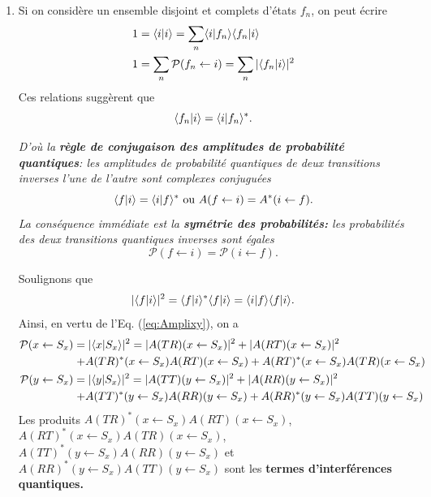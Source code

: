 \begin{enumerate}
\item Si on considère un ensemble disjoint et complets d'états $f_{n}$, on
peut écrire%
\begin{subequations}%
\begin{align}
1  &  =\langle i\ket{i} =\sum_{n}\langle i\ket{f_{n}}\langle f_{n}\ket{i} \\
1  &  =\sum_{n}\mathcal{P}(f_{n}\leftarrow i)=\sum_{n}|\langle
f_{n}\ket{i}|^{2}%
\end{align}%
\end{subequations}%
Ces relations suggèrent que%
\begin{equation}
\langle f_{n}\vert i\rangle =\langle i\vert f_{n}\rangle^{\ast}.
\end{equation}
\colorbox[gray]{0.8}{
\parbox[c]{0.9\textwidth}{
\emph{D'où la \textbf{règle de conjugaison des amplitudes de probabilité
quantiques}: les amplitudes de probabilité quantiques de deux transitions
inverses l'une de l'autre sont complexes conjuguées}
\begin{equation}
\langle f\vert i\rangle =\langle i\vert f\rangle^{\ast }\text{ ou }A(f\leftarrow
i)=A^{\ast}(i\leftarrow f).\label{eq:ReglConjug}
\end{equation}
\emph{La conséquence immédiate est la \textbf{symétrie des probabilités:} les
probabilités des deux transitions quantiques inverses sont égales}
\begin{equation}
\mathcal{P}(f\leftarrow i)=\mathcal{P}(i\leftarrow f).
\end{equation}
}}
\medskip

Soulignons que
\begin{equation}
|\langle f\vert i\rangle |^{2}=\langle f\vert i\rangle ^{\ast}\langle f\vert i\rangle
=\langle i\vert f\rangle\langle f\vert i\rangle .
\end{equation}
Ainsi, en vertu de l'Eq. (\ref{eq:Amplixy}), on a%
\begin{subequations}%
\begin{align}
\mathcal{P}(x\leftarrow S_{x}) & =|\bra{x}S_{x}\rangle|^{2}=|A(TR)(x\leftarrow
S_{x})|^{2}+|A(RT)(x\leftarrow S_{x})|^{2}\nonumber\\
&  \left.  +A(TR)^{\ast}(x\leftarrow S_{x})A(RT)(x\leftarrow S_{x})
+A(RT)^{\ast}(x\leftarrow S_{x})A(TR)(x\leftarrow S_{x})\right. \\
\mathcal{P}(y\leftarrow S_{x}) & =|\bra{y}S_{x}\rangle|^{2}=|A(TT)(y\leftarrow
S_{x})|^{2}+|A(RR)(y\leftarrow S_{x})|^{2}\nonumber\\
&  \left.  +A(TT)^{\ast}(y\leftarrow S_{x})A(RR)(y\leftarrow S_{x}%
)+A(RR)^{\ast}(y\leftarrow S_{x})A(TT)(y\leftarrow S_{x})\right.
\end{align}%
\end{subequations}
Les produits $A(TR)^{\ast}(x\leftarrow S_{x})A(RT)(x\leftarrow S_{x})$,
$A(RT)^{\ast}(x\leftarrow S_{x})A(TR)(x\leftarrow S_{x})$, $A(TT)^{\ast
}(y\leftarrow S_{x})A(RR)(y\leftarrow S_{x})$ et $A(RR)^{\ast}(y\leftarrow
S_{x})A(TT)(y\leftarrow S_{x})$ sont les \textbf{termes d'interférences
quantiques.}


\end{enumerate}
